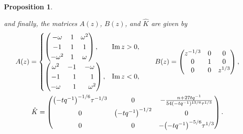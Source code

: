 \documentclass[10pt,a4paper]{amsart}
\numberwithin{equation}{section}
\newtheorem{Proposition}[Theorem]{Proposition}
 { \theoremstyle{definition}
\newtheorem{Definition}[Theorem]{Definition}
\newtheorem{Note}[Theorem]{Note}
\newtheorem{Example}[Theorem]{Example}
\newtheorem{Remark}[Theorem]{Remark} }
\begin{document}
\begin{Proposition}
\begin{enumerate}
and finally, the matrices $A(z)$, $B(z)$, and $\hat{K}$ are given by
 \begin{gather*}
 A(z) =
 \begin{cases}
 \begin{pmatrix}
 -\omega & 1 & \omega^2\\
 -1 & 1 & 1\\
 -\omega^2 & 1 & \omega
 \end{pmatrix}, & \operatorname{Im} z > 0,\\[2.5mm]
 \begin{pmatrix}
 \omega^2 & -1 & -\omega\\
 -1 & \hphantom{-}1 & \hphantom{-}1\\
 -\omega & \hphantom{-}1 & \hphantom{-}\omega^2\\
 \end{pmatrix}, & \operatorname{Im} z < 0,
 \end{cases}
 \qquad
 B(z) =
 \begin{pmatrix}
 z^{-1/3} & 0 & 0\\
 0 & 1 & 0\\
 0 & 0 & z^{1/3}
 \end{pmatrix},
 \\
 \hat{K} =
 \begin{pmatrix}
 \bigl(-tq^{-1}\bigr)^{-1/6}\tau^{-1/3} & 0 & -\frac{n+27 tq^{-1}}{54(-tq^{-1})^{13/6}\tau^{1/3}}\\[1.4mm]
 0 & \bigl(-tq^{-1}\bigr)^{-1/2} & 0\\[1.1mm]
 0 & 0 & -\bigl(-tq^{-1}\bigr)^{-5/6}\tau^{1/3}
 \end{pmatrix}.
 \end{gather*}
 \end{enumerate}
 \end{Proposition}
\end{document}
